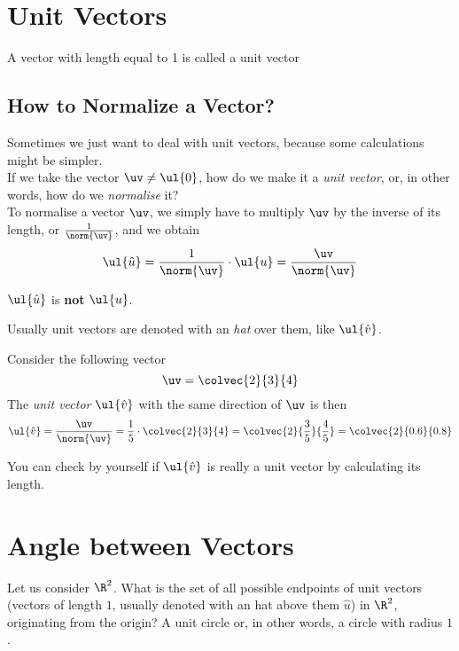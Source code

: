 \section{Unit Vectors}
\begin{definition}
A vector with length equal to 1 is called a unit vector
\end{definition}

\subsection{How to Normalize a Vector?}
Sometimes we just want to deal with unit vectors, because some calculations might be simpler. \\
If we take the vector $\uv\not=\ul{0}$, how do we make it a \textit{unit vector}, or, in other words, how do we \textit{normalise} it? \\
To normalise a vector $\uv$, we simply have to multiply $\uv$ by the inverse of its length, or $\frac{1}{\norm{\uv}}$, and we obtain
$$\ul{\hat{u}} = \frac{1}{\norm{\uv}}\cdot \ul{u} = \frac{\uv}{\norm{\uv}}$$
\begin{note}
$\ul{\hat{u}}$ is \textbf{not} $\ul{u}$.
\end{note}

\begin{notation}
Usually unit vectors are denoted with an \textit{hat} over them, like $\ul{\hat{v}}$.
\end{notation}

\begin{example}
\noindent Consider the following vector
\[
\uv = \colvec{2}{3}{4}
\]
The \textit{unit vector} $\ul{\hat{v}}$ with the same direction of $\uv$ is then
\[\ul{\hat{v}}=\frac{\uv}{\norm{\uv}} = \frac{1}{5}\cdot \colvec{2}{3}{4} = \colvec{2}{\frac{3}{5}}{\frac{4}{5}} = \colvec{2}{0.6}{0.8}\]
\end{example}
\begin{note}
You can check by yourself if $\ul{\hat{v}}$ is really a unit vector by calculating its length.
\end{note}

\section{Angle between Vectors}
Let us consider $\R^2$. What is the set of all possible endpoints of unit vectors (vectors of length $1$, usually denoted with an hat above them $\hat{u}$) in $\R^2$, originating from the origin? A unit circle or, in other words, a circle with radius $1$.

